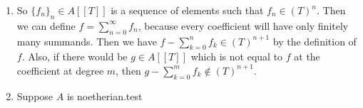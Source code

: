 \newcommand{\sheet}{3}




\maketitle

\begin{exercise}{1}
    \begin{enumerate}
        \item So $\{f_n\}_n \in A[[T]]$ is a sequence of elements such that $f_n
            \in {(T)}^n$. Then we can define $f = \sum^{\infty}_{n = 0} f_n$,
            because every coefficient will have only finitely many summands.
            Then we have $f - \sum^{n}_{k = 0} f_k \in {(T)}^{n+1}$ by
            the definition of $f$. Also, if there would be $g \in A[[T]]$ which
            is not equal to $f$ at the coefficient at degree $m$, then $g -
            \sum^{m}_{k = 0} f_k \notin {(T)}^{n+1}$.
        \item Suppose $A$ is noetherian.test
    \end{enumerate}
\end{exercise}


